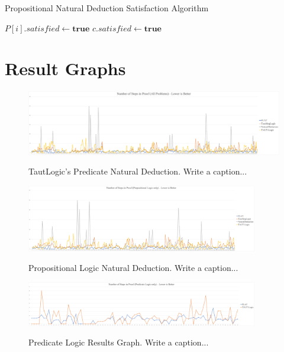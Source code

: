 \documentclass[ms]{uncgdissertationexp2}
\theoremstyle{plain}
\theoremstyle{definition}
\theoremstyle{remark}
\newcommand{\titlecaption}[2]{\caption[#1]{#1. #2}}
\begin{document}
\begin{algorithm}
	\caption{Propositional Natural Deduction Satisfaction Algorithm}\label{euclid}
	\begin{algorithmic}[1]
		\State $P[i].satisfied\gets{\textbf{true}}$
		\EndIf
		\EndFor
		\State $c.satisfied\gets{\textbf{true}}$
		\EndIf
		\EndWhile
		\EndProcedure
	\end{algorithmic}
\end{algorithm}

\chapter{Result Graphs}

\begin{figure}
	\centering
	\includegraphics[width=1\textwidth]{all-proofs-graph.png}
	\titlecaption{TautLogic's Predicate Natural Deduction}{Write a caption...}
	\label{fig:allproofsgraph}
\end{figure} 

\begin{figure}[ht]
	\centering
	\includegraphics[width=0.9\textwidth]{prop-graph.png}
	\titlecaption{Propositional Logic Natural Deduction}{Write a caption...}
	\label{fig:propgraph}
\end{figure} 

\begin{figure}[ht]
	\centering
	\includegraphics[width=0.9\textwidth]{pred-graph.png}
	\titlecaption{Predicate Logic Results Graph}{Write a caption...}
	\label{fig:predgraph}
\end{figure} 

\backmatter
\end{document}
